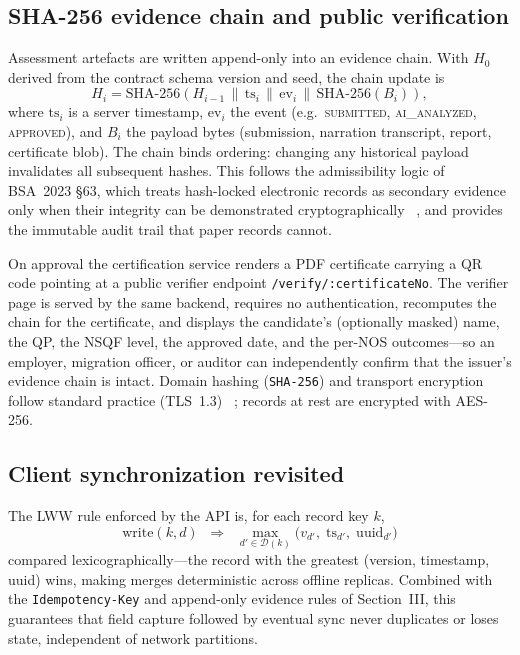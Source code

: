 \documentclass[conference]{IEEEtran}
\begin{document}
\subsection{SHA-256 evidence chain and public verification}
\label{sec:audit}
Assessment artefacts are written append-only into an evidence chain. With $H_0$ derived
from the contract schema version and seed, the chain update is
\begin{equation}
H_i = \mathrm{SHA\text{-}256}\!\left(H_{i-1} \,\|\, \mathrm{ts}_i \,\|\,
\mathrm{ev}_i \,\|\, \mathrm{SHA\text{-}256}(B_i)\right),
\label{eq:chain}
\end{equation}
where $\mathrm{ts}_i$ is a server timestamp, $\mathrm{ev}_i$ the event (e.g.\
\textsc{submitted}, \textsc{ai\_analyzed}, \textsc{approved}), and $B_i$ the payload bytes
(submission, narration transcript, report, certificate blob). The chain binds ordering:
changing any historical payload invalidates all subsequent hashes. This follows the
admissibility logic of BSA~2023 \S63, which treats hash-locked electronic records as
secondary evidence only when their integrity can be demonstrated cryptographically
~\cite{bsa_2023}, and provides the immutable audit trail that paper records cannot.

On approval the certification service renders a PDF certificate carrying a QR code pointing
at a public verifier endpoint \texttt{/verify/:certificateNo}. The verifier page is served
by the same backend, requires no authentication, recomputes the chain for the certificate,
and displays the candidate's (optionally masked) name, the QP, the NSQF level, the approved
date, and the per-NOS outcomes---so an employer, migration officer, or auditor can
independently confirm that the issuer's evidence chain is intact. Domain hashing
(\texttt{SHA-256}) and transport encryption follow standard practice (TLS~1.3)
~\cite{rfc8446}; records at rest are encrypted with AES-256.

\subsection{Client synchronization revisited}
The LWW rule enforced by the API is, for each record key $k$,
\begin{equation}
\mathrm{write}(k, d) \;\; \Rightarrow \;\;
\max_{d' \in \mathcal{D}(k)} \big(v_{d'},\; \mathrm{ts}_{d'},\; \mathrm{uuid}_{d'}\big)
\label{eq:lww}
\end{equation}
compared lexicographically---the record with the greatest (version, timestamp, uuid) wins,
making merges deterministic across offline replicas. Combined with the
\texttt{Idempotency-Key} and append-only evidence rules of Section~III, this guarantees that
field capture followed by eventual sync never duplicates or loses state, independent of
network partitions.
\end{document}
